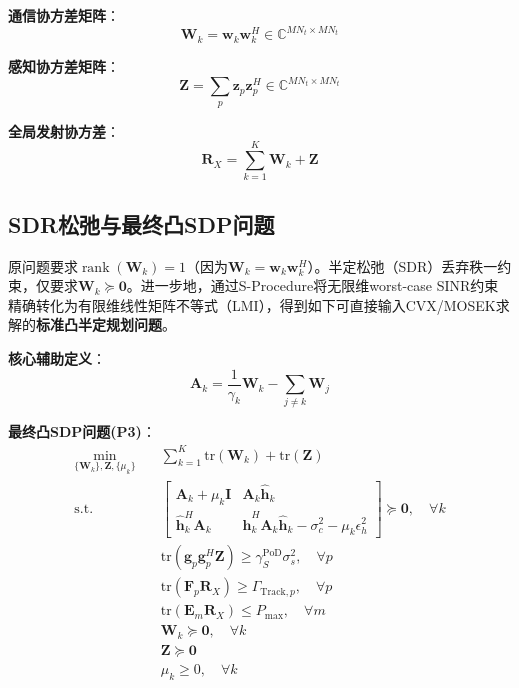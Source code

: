\documentclass[12pt,a4paper]{article}
\newcommand{\vect}[1]{\mathbf{#1}}
\newcommand{\mat}[1]{\mathbf{#1}}
\newcommand{\tr}{\text{tr}}
\DeclareMathOperator{\rank}{rank}
\begin{document}
\textbf{通信协方差矩阵}：
\begin{equation}
\mat{W}_k = \vect{w}_k \vect{w}_k^H \in \mathbb{C}^{MN_t \times MN_t} \tag{15}
\end{equation}

\textbf{感知协方差矩阵}：
\begin{equation}
\mat{Z} = \sum_p \vect{z}_p \vect{z}_p^H \in \mathbb{C}^{MN_t \times MN_t} \tag{16}
\end{equation}

\textbf{全局发射协方差}：
\begin{equation}
\mat{R}_X = \sum_{k=1}^K \mat{W}_k + \mat{Z} \tag{17}
\end{equation}

\subsection{SDR松弛与最终凸SDP问题}

原问题要求$\rank(\mat{W}_k) = 1$（因为$\mat{W}_k = \vect{w}_k \vect{w}_k^H$）。半定松弛（SDR）丢弃秩一约束，仅要求$\mat{W}_k \succeq \mat{0}$。进一步地，通过S-Procedure将无限维worst-case SINR约束精确转化为有限维线性矩阵不等式（LMI），得到如下可直接输入CVX/MOSEK求解的\textbf{标准凸半定规划问题}。

\textbf{核心辅助定义}：
\begin{equation}
\mat{A}_k = \frac{1}{\gamma_k} \mat{W}_k - \sum_{j \neq k} \mat{W}_j
\end{equation}

\textbf{最终凸SDP问题(P3)}：
\begin{align}
\min_{\{\mat{W}_k\}, \mat{Z}, \{\mu_k\}} \quad & \sum_{k=1}^K \tr(\mat{W}_k) + \tr(\mat{Z}) \tag{P3} \\
\text{s.t.} \quad & \begin{bmatrix} \mat{A}_k + \mu_k \mat{I} & \mat{A}_k \hat{\vect{h}}_k \\[1.5ex] \hat{\vect{h}}_k^H \mat{A}_k & \hat{\vect{h}}_k^H \mat{A}_k \hat{\vect{h}}_k - \sigma_c^2 - \mu_k \epsilon_h^2 \end{bmatrix} \succeq \mat{0}, \quad \forall k \label{eq:lmi_comm} \\
& \tr(\vect{g}_p \vect{g}_p^H \mat{Z}) \geq \gamma_S^{\text{PoD}} \sigma_s^2, \quad \forall p \label{eq:sinr_sens_sdp} \\
& \tr(\mat{F}_p \mat{R}_X) \geq \Gamma_{\text{Track},p}, \quad \forall p \label{eq:pcrb_sdp} \\
& \tr(\mat{E}_m \mat{R}_X) \leq P_{\max}, \quad \forall m \label{eq:power_sdp} \\
& \mat{W}_k \succeq \mat{0}, \quad \forall k \label{eq:psd_w} \\
& \mat{Z} \succeq \mat{0} \label{eq:psd_z} \\
& \mu_k \geq 0, \quad \forall k \label{eq:mu_nonneg}
\end{align}
\end{document}
